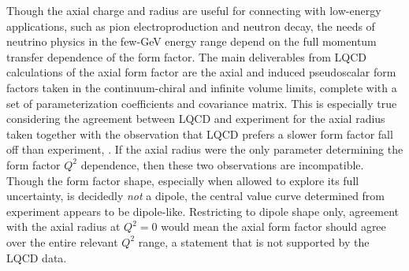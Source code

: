 

Though the axial charge and radius are useful for connecting with low-energy applications,
 such as pion electroproduction and neutron decay,
 the needs of neutrino physics in the few-GeV energy range depend
 on the full momentum transfer dependence of the form factor.
The main deliverables from LQCD calculations of the axial form factor
 are the axial and induced pseudoscalar form factors taken in the continuum-chiral
 and infinite volume limits, complete with a set of parameterization coefficients
 and covariance matrix.
This is especially true considering the agreement between LQCD and experiment
 for the axial radius taken together with the observation that
 LQCD prefers a slower form factor fall off than experiment,
 .
If the axial radius were the only parameter determining the form factor $Q^2$ dependence,
 then these two observations are incompatible.
Though the form factor shape, especially when allowed to explore its full uncertainty,
 is decidedly \emph{not} a dipole, the central value curve determined
 from experiment appears to be dipole-like.
Restricting to dipole shape only, agreement with the axial radius at $Q^2=0$
 would mean the axial form factor should agree over the entire relevant $Q^2$ range,
 a statement that is not supported by the LQCD data.
